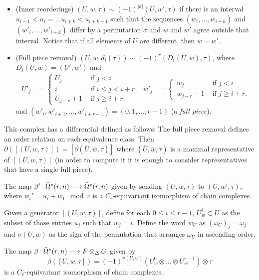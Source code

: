 \begin{itemize}
	\item (Inner reorderings) $(U,w,\tau)\sim (-1)^{|\sigma|}(U,w',\tau)$ if there is an interval $u_{i-1}<u_i =\ldots u_{i+k}<u_{i+k+1}$ such that the sequences $(w_i,\ldots,w_{i+k})$ and $(w'_i,\ldots,w'_{i+k})$ differ by a permutation $\sigma$ and $w$ and $w'$ agree outside that interval. Notice that if all elements of $U$ are different, then $w=w'$.
	\item (Full piece removal) $(U,w,d_i(\tau))\sim (-1)^r(D_i(U,w),\tau)$, where $D_i(U,w) = (U',w')$ and
	\begin{align*}
		U'_j &= \begin{cases} U_j &\text{ if $j<i$} \\ i & \text{ if $i\leq j < i+r$} \\ U_{j-r} + 1 & \text{ if $j\geq i+r$.}\end{cases} &
		w'_j &= \begin{cases} w_j &\text{ if $j<i$} \\ w_{j-r} - 1 & \text{ if $j\geq i+r$.}\end{cases}
	\end{align*}
	and $(w'_{i},w'_{i+1},\ldots,w'_{i+r-1}) = (0,1,\ldots,r-1)$ (a \emph{full piece}).
\end{itemize}
This complex has a differential defined as follows: The full piece removal defines an order relation on each equivalence class. Then $\partial([(U,w,\tau)]) = [\partial(\bar{U},\bar{w},\tau)]$ where $(\bar{U},\bar{w},\tau)$ is a maximal representative of $[(U,w,\tau)]$ (in order to compute it it is enough to consider representatives that have a single full piece).

\begin{lemma} The map $\beta'\colon \bar{\Omega}^*(r,n)\longrightarrow \bar{\Omega}^*(r,n)$ given by sending $(U,w,\tau)$ to $(U,w',\tau)$, where $w_i' = u_i+w_1\mod r$ is a $C_r$-equivariant isomorphism of chain complexes.
\end{lemma}

Given a generator $[(U,w,\tau)]$, define for each $0\leq i\leq r-1$, $U_w^i \subset U$ as the subset of those entries $u_j$ such that $w_j=i$. Define the word $w_U$ as $(\omega_U)_j = \omega_j$ and $\sigma(U,w)$ as the sign of the permutation that arranges $\omega_U$ in ascending order. 
\begin{lemma} The map $\beta\colon \bar{\Omega}^*(r,n)\longrightarrow F\otimes_\Delta G$ given by
	\[\beta([U,w,\tau]) = (-1)^{\sigma(U,w)}(U_w^0\otimes\ldots\otimes U_w^{r-1})\otimes \tau\]
	is a $C_r$-equivariant isomorphism of chain complexes.
\end{lemma}









